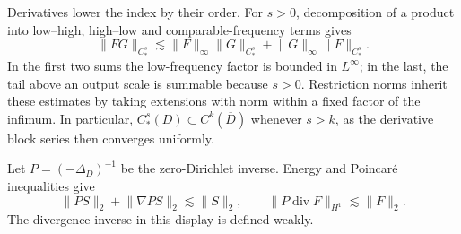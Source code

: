\documentclass[11pt]{article}
\theoremstyle{remark}
\newcommand{\diver}{\operatorname{div}}
\newcommand{\norm}[1]{\lVert #1\rVert}
\begin{document}
Derivatives lower the index by their order. For $s>0$, decomposition of a product into low--high, high--low and comparable-frequency terms gives
\begin{equation}\label{eq:product}
 \norm{FG}_{C_*^s}\lesssim
 \norm{F}_\infty\norm{G}_{C_*^s}
 +\norm{G}_\infty\norm{F}_{C_*^s}.
\end{equation}
In the first two sums the low-frequency factor is bounded in $L^\infty$; in the last, the tail above an output scale is summable because $s>0$. Restriction norms inherit these estimates by taking extensions with norm within a fixed factor of the infimum. In particular, $C_*^s(D)\subset C^k(\overline D)$ whenever $s>k$, as the derivative block series then converges uniformly.

Let $P=(-\Delta_D)^{-1}$ be the zero-Dirichlet inverse. Energy and Poincar\'e inequalities give
\begin{equation}\label{eq:energy}
 \norm{PS}_2+\norm{\nabla PS}_2\lesssim\norm{S}_2,
 \qquad
 \norm{P\diver F}_{H^1}\lesssim\norm{F}_2.
\end{equation}
The divergence inverse in this display is defined weakly.
\end{document}
